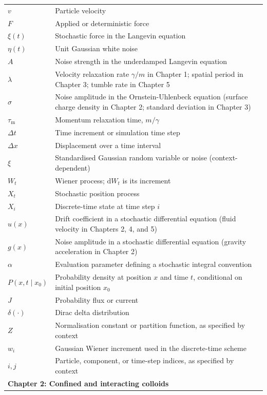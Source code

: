 \begin{longtable}{p{3cm}p{11cm}}
$v$ & Particle velocity \\
$F$ & Applied or deterministic force \\
$\xi(t)$ & Stochastic force in the Langevin equation \\
$\eta(t)$ & Unit Gaussian white noise \\
$A$ & Noise strength in the underdamped Langevin equation \\
$\lambda$ & Velocity relaxation rate $\gamma/m$ in Chapter 1; spatial period in Chapter 3; tumble rate in Chapter 5 \\
$\sigma$ & Noise amplitude in the Ornstein-Uhlenbeck equation (surface charge density in Chapter 2; standard deviation in Chapter 3) \\
$\tau_\mathrm{m}$ & Momentum relaxation time, $m/\gamma$ \\
$\Delta t$ & Time increment or simulation time step \\
$\Delta x$ & Displacement over a time interval \\
$\xi$ & Standardised Gaussian random variable or noise (context-dependent) \\
$W_t$ & Wiener process; $\mathrm dW_t$ is its increment \\
$X_t$ & Stochastic position process \\
$X_i$ & Discrete-time state at time step $i$ \\
$u(x)$ & Drift coefficient in a stochastic differential equation (fluid velocity in Chapters 2, 4, and 5) \\
$g(x)$ & Noise amplitude in a stochastic differential equation (gravity acceleration in Chapter 2) \\
$\alpha$ & Evaluation parameter defining a stochastic integral convention \\
$P(x,t\mid x_0)$ & Probability density at position $x$ and time $t$, conditional on initial position $x_0$ \\
$J$ & Probability flux or current \\
$\delta(\cdot)$ & Dirac delta distribution \\
$Z$ & Normalisation constant or partition function, as specified by context \\
$w_i$ & Gaussian Wiener increment used in the discrete-time scheme \\
$i,j$ & Particle, component, or time-step indices, as specified by context \\
\hline
\multicolumn{2}{l}{\textbf{Chapter 2: Confined and interacting colloids}}\\

\end{longtable}
